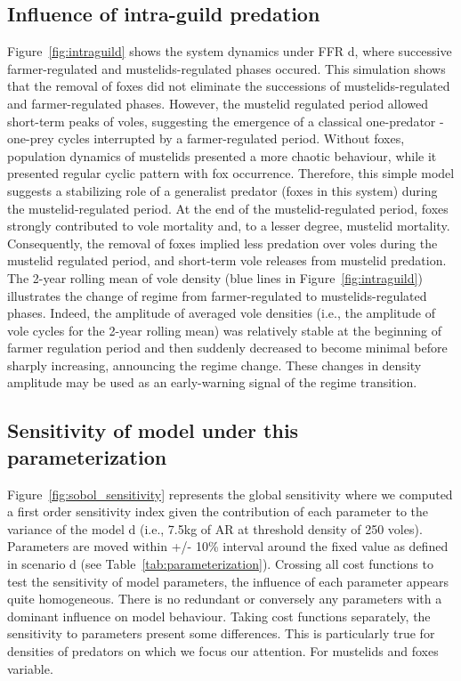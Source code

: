 \documentclass[11pt]{article}
\begin{document}
\subsection{Influence of intra-guild predation}

Figure~\ref{fig:intraguild} shows the system dynamics under FFR d, where successive farmer-regulated and mustelids-regulated phases occured. This simulation shows that the removal of foxes did not eliminate the successions of mustelids-regulated and farmer-regulated phases. However, the mustelid regulated period allowed short-term peaks of voles, suggesting the emergence of a classical one-predator - one-prey cycles interrupted by a farmer-regulated period. Without foxes, population dynamics of mustelids presented a more chaotic behaviour, while it presented regular cyclic pattern with fox occurrence. Therefore, this simple model suggests a stabilizing role of a generalist predator (foxes in this system) during the mustelid-regulated period. At the end of the mustelid-regulated period, foxes strongly contributed to vole mortality and, to a lesser degree, mustelid mortality. Consequently, the removal of foxes implied less predation over voles during the mustelid regulated period, and short-term vole releases from mustelid predation. The 2-year rolling mean of vole density (blue lines in Figure~\ref{fig:intraguild}) illustrates the change of regime from farmer-regulated to mustelids-regulated phases. Indeed, the amplitude of averaged vole densities (i.e., the amplitude of vole cycles for the 2-year rolling mean) was relatively stable at the beginning of farmer regulation period and then suddenly decreased to become minimal before sharply increasing, announcing the regime change. These changes in density amplitude may be used as an early-warning signal of the regime transition. 

\subsection{Sensitivity of model under this parameterization}

%
Figure~\ref{fig:sobol_sensitivity} represents the global sensitivity where we computed a first order sensitivity index \citep{Sobol1993, Saltelli2019} given the contribution of each parameter to the variance of the model d (i.e., 7.5kg of AR at threshold density of 250 voles).
%
Parameters are moved within +/- 10\% interval around the fixed value as defined in scenario d (see Table~\ref{tab:parameterization}).
%
Crossing all cost functions to test the sensitivity of model parameters, the influence of each parameter appears quite homogeneous.
%
There is no redundant or conversely any parameters with a dominant influence on model behaviour.
%
Taking cost functions separately, the sensitivity to parameters present some differences.
%
This is particularly true for densities of predators on which we focus our attention.  
For mustelids and foxes variable.
\end{document}
